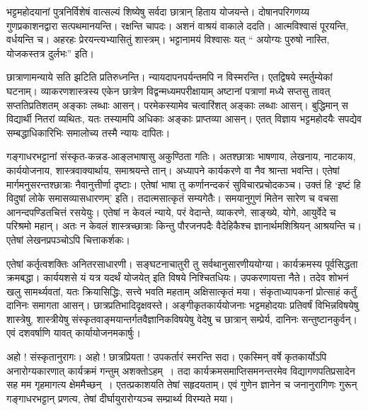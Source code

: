 {भट्टमहोदयानां पुत्रनिर्विशेषं वात्सल्यं शिष्येषु सर्वदा छात्रान् हिताय योजयन्ते। दोषानपरिगणय्य गुणप्रकाशनद्वारा सत्पथमानयन्ति। रक्षन्ति चापदः। अशनं वाश्रयं वाकाले ददति। आत्मविश्वासं पूरयन्ति, वर्धयन्ति च। अहरहः प्रेरयन्त्यभ्यासितुं शास्त्रम्। भट्टानामयं विश्वासः यत् “ अयोग्यः पुरुषो नास्ति, योजकस्तत्र दुर्लभः” इति। 

छात्राणामन्याये सति झटिति प्रतिरुध्नन्ति। न्यायदापनपर्यन्तमपि न विस्मरन्ति। एतद्विषये स्मर्तुम्येकां घटनाम्। व्याकरणशास्त्रस्य एकेन छात्रेण विद्वन्मध्यमपरीक्षायाम् अष्टानां पत्राणां मध्ये सप्तसु तावत् सप्ततिप्रतिशतम् अङ्काः लब्धाः आसन्। परमेकस्यामेव चत्वारिंशत् अङ्काः लब्धाः आसन्। बुद्धिमान् स विद्यार्थी नितरां व्यथितः, यतः तस्यामपि अधिकाः अङ्काः प्राप्तव्या आसन्। एतत् विज्ञाय भट्टमहोदयैः सपद्येव सम्बद्धाधिकारिभिः समालोच्य तस्मै न्यायः दापितः। 

गङ्गाधरभट्टानां संस्कृत-कन्नड-आङ्लभाषासु अकुण्ठिता गतिः। अतश्छात्राः भाषणाय, लेखनाय, नाटकाय, कार्ययोजनाय, शास्त्रवाक्यार्थाय, समाश्रयन्ते तान्। अध्यापने कार्यकरणे वा नैव श्रान्ता भवन्ति। एतेषां मार्गमनुसरन्तश्छात्राः नैवानुत्तीर्णा दृष्टाः। एतेषां भाषा तु कर्णानन्दकरं सुविचारप्रचोदकञ्च। उक्तं हि ‘इष्टं हि विदुषां लोके समासव्यासधारणम्’ इति। तदात्मसात्कृतं सम्यगेतैः। समयानुगुणं मितेन सारेण च वचसा आनन्दपण्डितचित्तं रसयेयुः। एतेषां न केवलं न्याये, परं वेदान्ते, व्याकरणे, साङ्ख्ये, योगे, आयुर्वेदे च परिश्रमो महान्। अतः न केवलं शास्त्रच्छात्राः किन्तु पौरजनपदैः वैदेहिकैश्च ज्ञानार्थमशिश्रियन् आश्रयन्ति च। एतेषां लेखनप्रपञ्चोऽपि चित्ताकर्शकः। 

एतेषां कर्तृत्वशक्तिः अनितरसाधारणी। सङ्घटनाचातुरी तु सर्वथानुसारणीययोग्या। कार्यक्रमस्य पूर्वसिद्धता क्रमबद्धा। कार्ययशसे यं यत्र यदर्थं योजयेत् इति विषये निश्चितधियः। उपकरणायत्ता नैते। तदेव शोभनं खलु सामर्थ्यवतां, यतः क्रियासिद्धिः, सत्त्वे भवति महताम् अक्षिसात्कृतं मया। संकृताध्यापकनां प्रोत्साहं कर्तुं दानिनः समागता आसन्। छात्रप्रतिभादिदृक्षवस्ते। अङ्गीकृतकार्ययोजनाः भट्टमहोदयाः प्रतिवर्षं विभिन्नविषयेषु शास्त्रेषु, शास्त्रीयेषु  संस्कृतवाङ्मयान्तर्गतवैज्ञानिकविषयेषु वेदेषु च छात्रान् सम्प्रेर्य, दानिनः सन्तुष्टानकुर्वन्। एवं दशवर्षाणि यावत् कार्यायोजनमकार्षुः। 

अहो ! संस्कृतानुरागः। अहो ! छात्रप्रियता ! उपकर्तारं स्मरन्ति सदा। एकस्मिन् वर्षे कृतकार्योऽपि अनारोग्यकारणात् कार्यक्रमं गन्तुम् अशक्तोऽहम्~। तदा कार्यक्रम\-समाप्तिसमनन्तरमेव विद्यागणपतिप्रसादेन सह मम गृहमागत्य क्षेममैच्छन्~। एतत्प्रकाशयति तेषां सहृदयताम्। एवं गुणेन ज्ञानेन च जनानुरागिणः गुरून् गङ्गाधरभट्टान् प्रणत्य, तेषां दीर्घायुरारोग्यञ्च सम्प्रार्थ्य विरम्यते मया।  

\articleend
}
